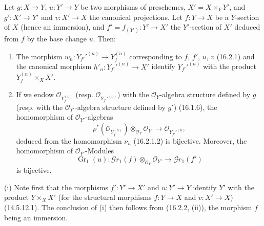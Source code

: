 \begin{corollary}[16.2.3]
\label{IV.16.2.3}
Let $g:X\to Y$, $u:Y'\to Y$ be two morphisms of preschemes,
$X'=X\times_Y Y'$, and $g':X'\to Y'$ and $v:X'\to X$ the canonical projections.
Let $f:Y\to X$ be a $Y$-section of $X$ (hence an immersion), and
$f'=f_{(Y')}:Y'\to X'$ the $Y'$-section of $X'$ deduced from $f$ by the
base change $u$. Then:
\begin{enumerate}
\item[\textup{(i)}] The morphism
$w_n:Y_{f'}'^{(n)}\to Y_f^{(n)}$ corresponding to $f$, $f'$, $u$, $v$
\textup{(16.2.1)} and the canonical morphism
$h'_n:Y_{f'}'^{(n)}\to X'$ identify $Y_{f'}'^{(n)}$ with the product
$Y_f^{(n)}\times_X X'$.
\item[\textup{(ii)}] If we endow $\mathcal{O}_{Y_f^{(n)}}$ \textup{(resp.}
$\mathcal{O}_{Y_{f'}'^{(n)}}$\textup{)} with the $\mathcal{O}_Y$-algebra structure
defined by $g$ \textup{(resp.} with the $\mathcal{O}_{Y'}$-algebra structure defined
by $g'$\textup{)} \textup{(16.1.6)}, the homomorphism of $\mathcal{O}_{Y'}$-algebras
\[
  \rho^*(\mathcal{O}_{Y_f^{(n)}})
  \otimes_{\mathcal{O}_Y}\mathcal{O}_{Y'}
  \longrightarrow
  \mathcal{O}_{Y_{f'}'^{(n)}}
  \tag{16.2.3.1}
  \label{IV.16.2.3.1}
\]
deduced from the homomorphism $\nu_n$ \textup{(16.2.1.2)} is bijective. Moreover,
the homomorphism of $\mathcal{O}_{Y'}$-Modules
\[
  \operatorname{Gr}_1(u):
  \mathscr{G}r_1(f)\otimes_{\mathcal{O}_Y}\mathcal{O}_{Y'}
  \longrightarrow\mathscr{G}r_1(f')
  \tag{16.2.3.2}
  \label{IV.16.2.3.2}
\]
is bijective.
\end{enumerate}
\end{corollary}

\noindent(i) Note first that the morphisms $f':Y'\to X'$ and $u:Y'\to Y$
identify $Y'$ with the product $Y\times_X X'$ (for the structural morphisms
$f:Y\to X$ and $v:X'\to X$) (14.5.12.1). The conclusion of (i) then follows from
(16.2.2, (ii)), the morphism $f$ being an immersion.

